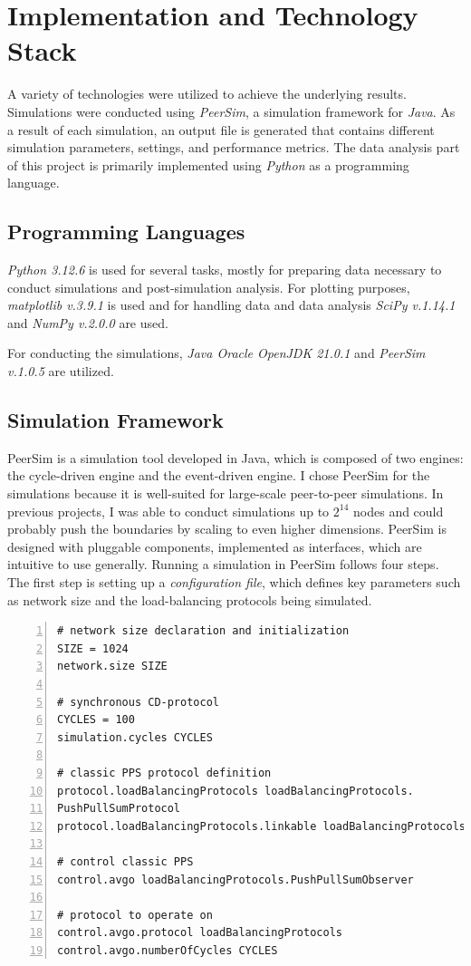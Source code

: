 \chapter{Implementation and Technology Stack}\label{chap:implementation}
A variety of technologies were utilized to achieve the underlying results. Simulations were conducted using \textit{PeerSim}, a simulation framework for \textit{Java}. As a result of each simulation, an output file is generated that contains different simulation parameters, settings, and performance metrics. The data analysis part of this project is primarily implemented using \textit{Python} as a programming language.

\section{Programming Languages}\label{sec:proglangs}
\textit{Python 3.12.6} is used for several tasks, mostly for preparing data necessary to conduct simulations and post-simulation analysis. For plotting purposes, \textit{matplotlib v.3.9.1} is used and for handling data and data analysis \textit{SciPy v.1.14.1} and \textit{NumPy v.2.0.0} are used.

For conducting the simulations, \textit{Java Oracle OpenJDK 21.0.1} and \textit{PeerSim v.1.0.5} are utilized.

\section{Simulation Framework}\label{sec:simulationframework}
PeerSim is a simulation tool developed in Java, which is composed of two engines: the cycle-driven engine and the event-driven engine. I chose PeerSim for the simulations because it is well-suited for large-scale peer-to-peer simulations. In previous projects, I was able to conduct simulations up to $2^{14}$ nodes and could probably push the boundaries by scaling to even higher dimensions. PeerSim is designed with pluggable components, implemented as interfaces, which are intuitive to use generally. Running a simulation in PeerSim follows four steps. The first step is setting up a \textit{configuration file}, which defines key parameters such as network size and the load-balancing protocols being simulated.

\begin{lstlisting}[caption=Example configuration, captionpos=b, numbers=left, label=lst:exampleConfig]
# network size declaration and initialization
SIZE = 1024
network.size SIZE

# synchronous CD-protocol
CYCLES = 100
simulation.cycles CYCLES

# classic PPS protocol definition
protocol.loadBalancingProtocols loadBalancingProtocols.
PushPullSumProtocol
protocol.loadBalancingProtocols.linkable loadBalancingProtocols

# control classic PPS
control.avgo loadBalancingProtocols.PushPullSumObserver

# protocol to operate on
control.avgo.protocol loadBalancingProtocols
control.avgo.numberOfCycles CYCLES
\end{lstlisting}

